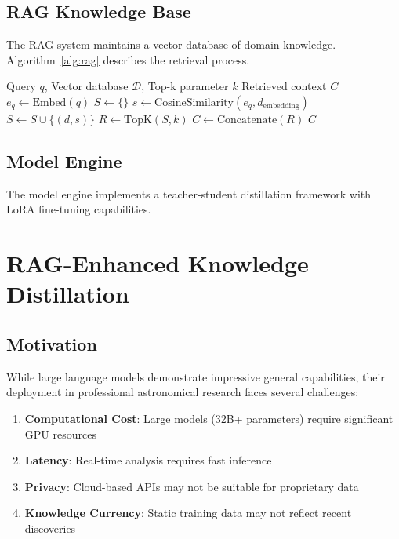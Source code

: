 \documentclass[11pt,a4paper]{article}
\begin{document}
\subsection{RAG Knowledge Base}

The RAG system maintains a vector database of domain knowledge. Algorithm~\ref{alg:rag} describes the retrieval process.

\begin{algorithm}[htbp]
\caption{RAG Retrieval Process}
\label{alg:rag}
\begin{algorithmic}[1]
\Require Query $q$, Vector database $\mathcal{D}$, Top-k parameter $k$
\Ensure Retrieved context $C$
\State $e_q \gets \text{Embed}(q)$ 
\State $S \gets \{\}$ 
    \State $s \gets \text{CosineSimilarity}(e_q, d_{\text{embedding}})$
    \State $S \gets S \cup \{(d, s)\}$
\EndFor
\State $R \gets \text{TopK}(S, k)$ 
\State $C \gets \text{Concatenate}(R)$
\State \Return $C$
\end{algorithmic}
\end{algorithm}

\subsection{Model Engine}

The model engine implements a teacher-student distillation framework with LoRA fine-tuning capabilities.

\section{RAG-Enhanced Knowledge Distillation}\label{sec:distillation}

\subsection{Motivation}

While large language models demonstrate impressive general capabilities, their deployment in professional astronomical research faces several challenges:

\begin{enumerate}
    \item \textbf{Computational Cost}: Large models (32B+ parameters) require significant GPU resources
    \item \textbf{Latency}: Real-time analysis requires fast inference
    \item \textbf{Privacy}: Cloud-based APIs may not be suitable for proprietary data
    \item \textbf{Knowledge Currency}: Static training data may not reflect recent discoveries
\end{enumerate}
\end{document}
